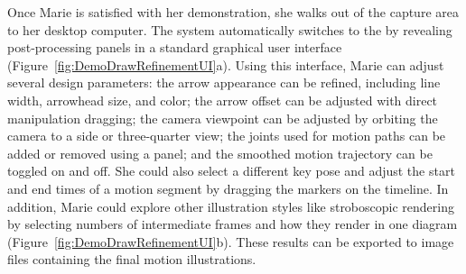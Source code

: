 Once Marie is satisfied with her demonstration, she walks out of the capture area to her desktop computer. The system automatically switches to the \phaseII{} by revealing post-processing panels in a standard graphical user interface (Figure~\ref{fig:DemoDrawRefinementUI}a).
Using this interface, Marie can adjust several design parameters:
the arrow appearance can be refined, including line width, arrowhead size, and color;
the arrow offset can be adjusted with direct manipulation dragging; %
the camera viewpoint can be adjusted by orbiting the camera to a side or three-quarter view;
the joints used for motion paths can be added or removed using a panel;
and the smoothed motion trajectory can be toggled on and off.
%
She could also select a different key pose and adjust the start and end times of a motion segment by dragging the markers on the timeline.
%
In addition, Marie could explore other illustration styles like stroboscopic rendering by selecting numbers of intermediate frames and how they render in one diagram (Figure~\ref{fig:DemoDrawRefinementUI}b).
%
These results can be exported to image files containing the final motion illustrations. %



